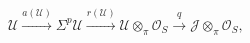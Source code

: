 \(\displaystyle
\mathcal U
  \xrightarrow{a(\mathcal U)}
\Sigma^p\mathcal U
  \xrightarrow{r(\mathcal U)}
\mathcal U\otimes_{\pi}\mathcal O_S
  \xrightarrow{q}
\mathcal J\otimes_{\pi}\mathcal O_S ,
\)
